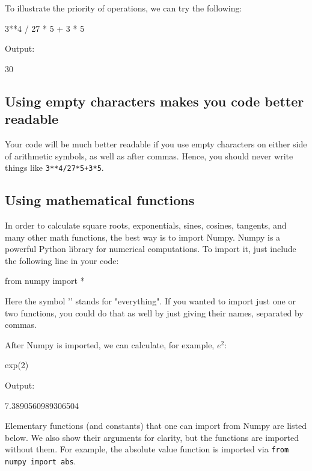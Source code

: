To illustrate the priority of operations, we can try the following:

\begin{bluecode}
3**4 / 27 * 5 + 3 * 5
\end{bluecode}
Output:

\begin{bluecode}
30
\end{bluecode}
\subsection{Using empty characters makes you code better readable}
Your code will be much better readable if you use empty
characters on either side of arithmetic symbols, as well as 
after commas. Hence, you should never write things like {\tt 3**4/27*5+3*5}.

\subsection{Using mathematical functions}

In order to calculate square roots, exponentials, sines, cosines, tangents, and many other 
math functions, the best way is to import Numpy. Numpy is a powerful Python library 
for numerical computations. To import it, just include the following 
line in your code:

\begin{bluecode}
from numpy import *
\end{bluecode}
Here the symbol '{\tt *}' stands for "everything". If you wanted to import just one or two 
functions, you could do that as well by just giving their names, separated by commas. 

After Numpy is imported, we can calculate, for example, $e^2$:

\begin{bluecode}
exp(2)
\end{bluecode}
Output:
\begin{bluecode}
7.3890560989306504
\end{bluecode}
Elementary functions (and constants) that one can import from Numpy are listed
below. We also show their arguments for clarity, but the functions are imported without 
them. For example, the absolute value function is imported via {\tt from numpy import abs}.\\

